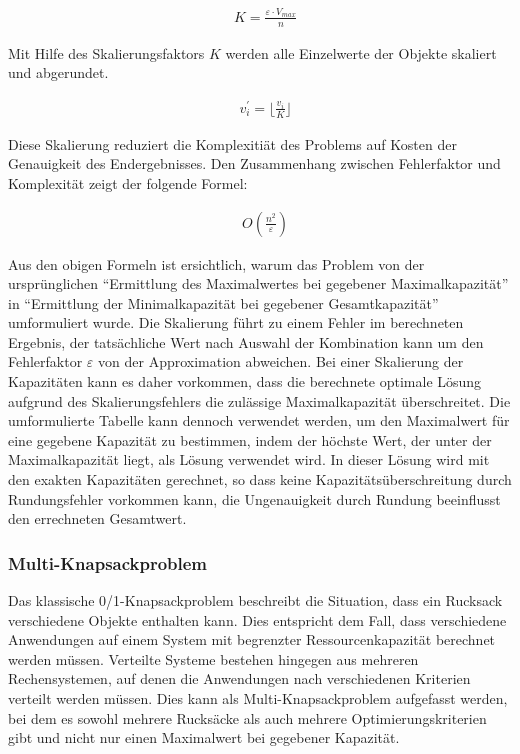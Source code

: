 \begin{align}
    & K = \frac{\varepsilon \cdot V_{max}}{n}
\end{align}

Mit Hilfe des Skalierungsfaktors $ K $ werden alle Einzelwerte der Objekte skaliert und abgerundet. 

\begin{align}
    & v_i^{\prime} = \lfloor \frac{v_i}{K} \rfloor
\end{align}

Diese Skalierung reduziert die Komplexitiät des Problems auf Kosten der Genauigkeit des Endergebnisses. Den Zusammenhang zwischen Fehlerfaktor und Komplexität zeigt der folgende Formel:

\begin{align}
    & O(\frac{n^2}{\varepsilon})
\end{align}

Aus den obigen Formeln ist ersichtlich, warum das Problem von der ursprünglichen \enquote{Ermittlung des Maximalwertes bei gegebener Maximalkapazität} in \enquote{Ermittlung der Minimalkapazität bei gegebener Gesamtkapazität} umformuliert wurde. Die Skalierung führt zu einem Fehler im berechneten Ergebnis, der tatsächliche Wert nach Auswahl der Kombination kann um den Fehlerfaktor $ \varepsilon $ von der Approximation abweichen. Bei einer Skalierung der Kapazitäten kann es daher vorkommen, dass die berechnete optimale Lösung aufgrund des Skalierungsfehlers die zulässige Maximalkapazität überschreitet. Die umformulierte Tabelle kann dennoch verwendet werden, um den Maximalwert für eine gegebene Kapazität zu bestimmen, indem der höchste Wert, der unter der Maximalkapazität liegt, als Lösung verwendet wird. In dieser Lösung wird mit den exakten Kapazitäten gerechnet, so dass keine Kapazitätsüberschreitung durch Rundungsfehler vorkommen kann, die Ungenauigkeit durch Rundung beeinflusst den errechneten Gesamtwert.

\subsubsection{Multi-Knapsackproblem}

Das klassische 0/1-Knapsackproblem beschreibt die Situation, dass ein Rucksack verschiedene Objekte enthalten kann. Dies entspricht dem Fall, dass verschiedene Anwendungen auf einem System mit begrenzter Ressourcenkapazität berechnet werden müssen. Verteilte Systeme bestehen hingegen aus mehreren Rechensystemen, auf denen die Anwendungen nach verschiedenen Kriterien verteilt werden müssen. Dies kann als Multi-Knapsackproblem aufgefasst werden, bei dem es sowohl mehrere Rucksäcke als auch mehrere Optimierungskriterien gibt und nicht nur einen Maximalwert bei gegebener Kapazität. 

